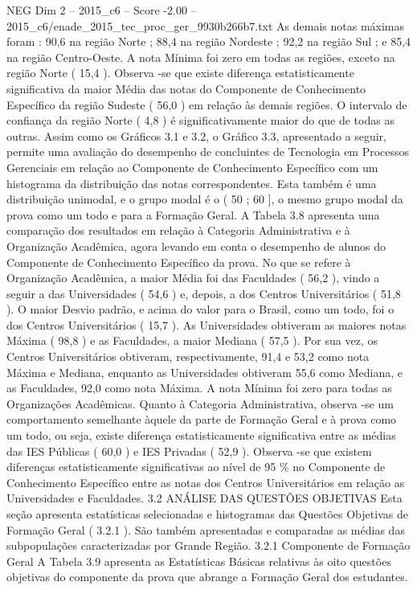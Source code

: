 \begin{textsample}{NEG Dim 2 – 2015\_c6 – Score -2.00 – 2015\_c6/enade\_2015\_tec\_proc\_ger\_9930b266b7.txt}
As demais notas máximas foram : 90,6 na região Norte ; 88,4 na região Nordeste ; 92,2 na região Sul ; e 85,4 na região Centro-Oeste.
A nota Mínima foi zero em todas as regiões, exceto na região Norte ( 15,4 ).
Observa -se que existe diferença estatisticamente significativa da maior Média das notas do Componente de Conhecimento Específico da região Sudeste ( 56,0 ) em relação às demais regiões.
O intervalo de confiança da região Norte ( 4,8 ) é significativamente maior do que de todas as outras.
Assim como os Gráficos 3.1 e 3.2, o Gráfico 3.3, apresentado a seguir, permite uma avaliação do desempenho de concluintes de Tecnologia em Processos Gerenciais em relação ao Componente de Conhecimento Específico com um histograma da distribuição das notas correspondentes.
Esta também é uma distribuição unimodal, e o grupo modal é o ( 50 ; 60 ], o mesmo grupo modal da prova como um todo e para a Formação Geral.
A Tabela 3.8 apresenta uma comparação dos resultados em relação à Categoria Administrativa e à Organização Acadêmica, agora levando em conta o desempenho de alunos do Componente de Conhecimento Específico da prova.
No que se refere à Organização Acadêmica, a maior Média foi das Faculdades ( 56,2 ), vindo a seguir a das Universidades ( 54,6 ) e, depois, a dos Centros Universitários ( 51,8 ).
O maior Desvio padrão, e acima do valor para o Brasil, como um todo, foi o dos Centros Universitários ( 15,7 ).
As Universidades obtiveram as maiores notas Máxima ( 98,8 ) e as Faculdades, a maior Mediana ( 57,5 ).
Por sua vez, os Centros Universitários obtiveram, respectivamente, 91,4 e 53,2 como nota Máxima e Mediana, enquanto as Universidades obtiveram 55,6 como Mediana, e as Faculdades, 92,0 como nota Máxima.
A nota Mínima foi zero para todas as Organizações Acadêmicas.
Quanto à Categoria Administrativa, observa -se um comportamento semelhante àquele da parte de Formação Geral e à prova como um todo, ou seja, existe diferença estatisticamente significativa entre as médias das IES Públicas ( 60,0 ) e IES Privadas ( 52,9 ).
Observa -se que existem diferenças estatisticamente significativas ao nível de 95 \% no Componente de Conhecimento Específico entre as notas dos Centros Universitários em relação as Universidades e Faculdades. 3.2 ANÁLISE DAS QUESTÕES OBJETIVAS Esta seção apresenta estatísticas selecionadas e histogramas das Questões Objetivas de Formação Geral ( 3.2.1 ).
São também apresentadas e comparadas as médias das subpopulações caracterizadas por Grande Região. 3.2.1 Componente de Formação Geral A Tabela 3.9 apresenta as Estatísticas Básicas relativas às oito questões objetivas do componente da prova que abrange a Formação Geral dos estudantes.

\end{textsample}
